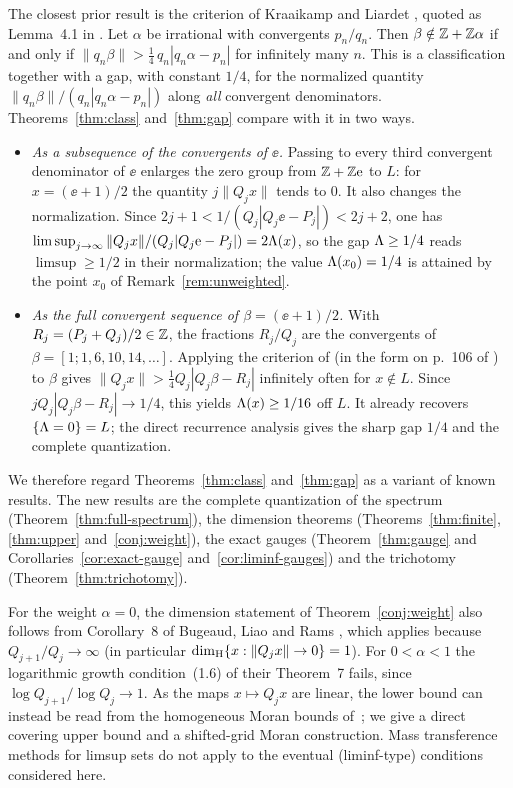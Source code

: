 The closest prior result is the criterion of Kraaikamp and Liardet \cite{KL},
quoted as Lemma~4.1 in \cite{BDS}. Let $\alpha$ be irrational with convergents
$p_n/q_n$. Then $\beta\notin\mathbb{Z}+\mathbb{Z}\alpha$ if and only if
$\|q_n\beta\|>\tfrac14\,q_n|q_n\alpha-p_n|$ for infinitely many $n$. This is a
classification together with a gap, with constant $1/4$, for the normalized
quantity $\|q_n\beta\|/(q_n|q_n\alpha-p_n|)$ along \emph{all} convergent
denominators. Theorems~\ref{thm:class} and~\ref{thm:gap} compare with it in two
ways.
\begin{itemize}[leftmargin=1.8em]
\item \emph{As a subsequence of the convergents of $\ee$.} Passing to every
third convergent denominator of $\ee$ enlarges the zero group from $\mathbb{Z}+\mathbb{Z}\mathrm{e}$
to $L$: for $x=(\ee+1)/2$ the quantity $j\|Q_jx\|$ tends to $0$. It also
changes the normalization. Since $2j+1<1/(Q_j|Q_j\ee-P_j|)<2j+2$, one has
$\limsup_{j\to\infty}\|Q_jx\|/(Q_j|Q_j\mathrm{e}-P_j|)=2\Lambda(x)$, so the gap
$\Lambda\ge1/4$ reads $\limsup\ge1/2$ in their normalization; the value
$\Lambda(x_0)=1/4$ is attained by the point $x_0$ of Remark~\ref{rem:unweighted}.
\item \emph{As the full convergent sequence of $\beta=(\ee+1)/2$.} With
$R_j=(P_j+Q_j)/2\in\mathbb{Z}$, the fractions $R_j/Q_j$ are the convergents of
$\beta=[1;1,6,10,14,\dots]$. Applying the criterion of \cite{KL} (in the form
on p.~106 of \cite{BDS}) to $\beta$ gives $\|Q_jx\|>\tfrac14Q_j|Q_j\beta-R_j|$
infinitely often for $x\notin L$. Since $jQ_j|Q_j\beta-R_j|\to1/4$, this
yields $\Lambda(x)\ge1/16$ off $L$. It already recovers $\{\Lambda=0\}=L$; the direct
recurrence analysis gives the sharp gap $1/4$ and the complete quantization.
\end{itemize}
We therefore regard Theorems~\ref{thm:class} and~\ref{thm:gap} as a variant of
known results. The new results are the complete quantization of the spectrum
(Theorem~\ref{thm:full-spectrum}), the dimension theorems
(Theorems~\ref{thm:finite}, \ref{thm:upper} and~\ref{conj:weight}), the exact
gauges (Theorem~\ref{thm:gauge} and Corollaries~\ref{cor:exact-gauge}
and~\ref{cor:liminf-gauges}) and the trichotomy
(Theorem~\ref{thm:trichotomy}).

For the weight $\alpha=0$, the dimension statement of Theorem~\ref{conj:weight}
also follows from Corollary~8 of Bugeaud, Liao and Rams \cite{BLR}, which applies
because $Q_{j+1}/Q_j\to\infty$ (in particular $\dim_{\mathrm{H}}\{x:\|Q_jx\|\to0\}=1$). For
$0<\alpha<1$ the logarithmic growth condition~(1.6) of their Theorem~7 fails,
since $\log Q_{j+1}/\log Q_j\to1$. As the maps $x\mapsto Q_jx$ are linear,
the lower bound can instead be read from the homogeneous Moran bounds
of~\cite{FWW}; we give a direct covering upper bound and a shifted-grid Moran
construction. Mass transference methods for limsup sets \cite{BV} do not apply
to the eventual (liminf-type) conditions considered here.

